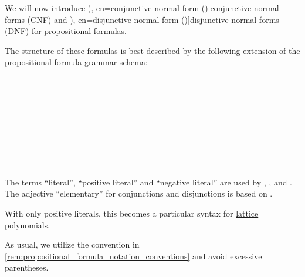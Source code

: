 \begin{definition}\label{def:cnf_and_dnf}\mimprovised
  We will now introduce \term[ru=конъюнктивная нормальная форма (\cite[def. 6.2]{Эдельман1975Логика}), en=conjunctive normal form (\cite[def. 1.3.10]{Hinman2005Logic})]{conjunctive normal forms} (CNF) and \term[ru=дизъюнктивная нормальная форма (\cite[def. 6.2]{Эдельман1975Логика}), en=disjunctive normal form (\cite[def. 1.3.10]{Hinman2005Logic})]{disjunctive normal forms} (DNF) for propositional formulas.

  The structure of these formulas is best described by the following extension of the \hyperref[def:propositional_formula]{propositional formula grammar schema}:
  \begin{longbnf*}
           {} \\
           {\synneg {}} \\
                    {       \bnfor {}} \\
     { \bnfor} \\
     \\
                        { \bnfor \bnftsq{(} \bnfsp {}              \bnfsp \bnftsq{\( \synwedge \)} \bnfsp {}             \bnfsp \bnftsq{)}} \\
     { \bnfor} \\
     \\
                        { \bnfor \bnftsq{(} \bnfsp {}              \bnfsp \bnftsq{\( \synvee \)}   \bnfsp {}             \bnfsp \bnftsq{)}}
  \end{longbnf*}
\end{definition}
\begin{comments}
  \item The terms \enquote{literal}, \enquote{positive literal} and \enquote{negative literal} are used by , ,  and . The adjective \enquote{elementary} for conjunctions and disjunctions is based on \cite[36]{Эдельман1975Логика}.
  \item With only positive literals, this becomes a particular syntax for \hyperref[rem:lattice_polynomials]{lattice polynomials}.
  \item As usual, we utilize the convention in \cref{rem:propositional_formula_notation_conventions} and avoid excessive parentheses.
\end{comments}

